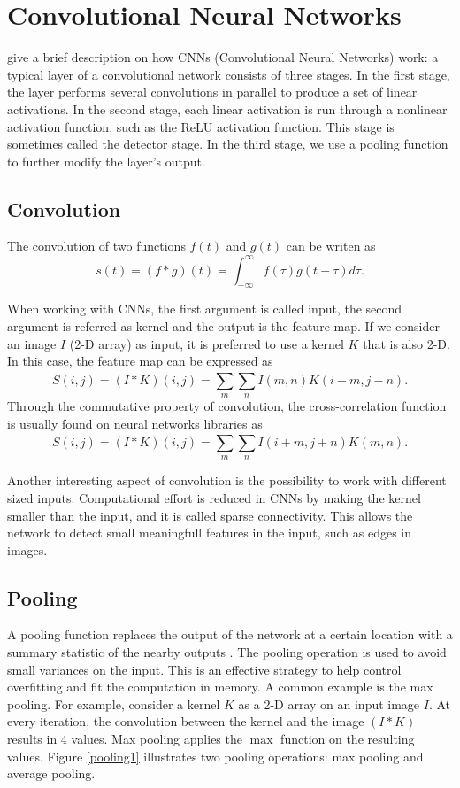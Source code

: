 \section{Convolutional Neural Networks}
 give a brief description on how CNNs (Convolutional Neural Networks) work: a typical layer of a convolutional network consists of three stages. In the ﬁrst stage, the layer performs several convolutions in parallel to produce a set of linear activations. In the second stage, each linear activation is run through a nonlinear activation function, such as the ReLU activation function. This stage is sometimes called the detector stage. In the third stage, we use a pooling function to further modify the layer's output.

\subsection{Convolution}
The convolution of two functions $f(t)$ and $g(t)$ can be writen as
\begin{equation}
	s(t) = (f*g)(t) = \int_{-\infty}^{\infty}f(\tau)g(t-\tau)d\tau.
\end{equation}

When working with CNNs, the first argument is called input, the second argument is referred as kernel and the output is the feature map. If we consider an image $I$ (2-D array) as input, it is preferred to use a kernel $K$ that is also 2-D. In this case, the feature map can be expressed as
\begin{equation}
	\label{convolution}
	S(i,j) = (I*K)(i,j) = \sum_{m}^{}\sum_{n}^{}I(m,n)K(i-m,j-n).
\end{equation}
Through the commutative property of convolution, the cross-correlation function is usually found on neural networks libraries as
\begin{equation}
	\label{cross}
	S(i,j) = (I*K)(i,j) = \sum_{m}^{}\sum_{n}^{}I(i+m,j+n)K(m,n).
\end{equation}

Another interesting aspect of convolution is the possibility to work with different sized inputs. Computational effort is reduced in CNNs by making the kernel smaller than the input, and it is called sparse connectivity. This allows the network to detect small meaningfull features in the input, such as edges in images.

\subsection{Pooling}
A pooling function replaces the output of the network at a certain location with a summary statistic of the nearby outputs \cite{Goodfellow-et-al-2016}. The pooling operation is used to avoid small variances on the input. This is an effective strategy to help control overfitting and fit the computation in memory. A common example is the max pooling. For example, consider a kernel $K$ as a 2-D array on an input image $I$. At every iteration, the convolution between the kernel and the image $(I*K)$ results in 4 values. Max pooling applies the $\max$ function on the resulting values. Figure \ref{pooling1} illustrates two pooling operations: max pooling and average pooling.

